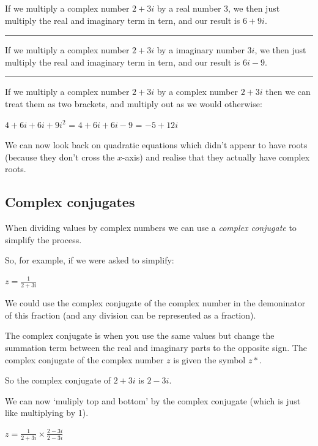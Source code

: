 \documentclass[
]{book}
\begin{document}
If we multiply a complex number \(2 + 3i\) by a real number \(3\), we then just multiply the real and imaginary term in tern, and our result is \(6+ 9i\).

\begin{center}\rule{0.5\linewidth}{0.5pt}\end{center}

If we multiply a complex number \(2 + 3i\) by a imaginary number \(3i\), we then just multiply the real and imaginary term in tern, and our result is \(6i-9\).

\begin{center}\rule{0.5\linewidth}{0.5pt}\end{center}

If we multiply a complex number \(2 + 3i\) by a complex number \(2+3i\) then we can treat them as two brackets, and multiply out as we would otherwise:

\(4 + 6 i + 6i + 9i^2\) = \(4 + 6 i + 6i - 9\) = \(-5+ 12i\)

We can now look back on quadratic equations which didn't appear to have roots (because they don't cross the \(x\)-axis) and realise that they actually have complex roots.

\hypertarget{complex-conjugates}{%
\subsection{Complex conjugates}\label{complex-conjugates}}

When dividing values by complex numbers we can use a \emph{complex conjugate} to simplify the process.

So, for example, if we were asked to simplify:

\(z = \frac{1}{2+3i}\)

We could use the complex conjugate of the complex number in the demoninator of this fraction (and any division can be represented as a fraction).

The complex conjugate is when you use the same values but change the summation term between the real and imaginary parts to the opposite sign. The complex conjugate of the complex number \(z\) is given the symbol \(z*\).

So the complex conjugate of \(2+3i\) is \(2-3i\).

We can now `muliply top and bottom' by the complex conjugate (which is just like multiplying by 1).

\(z = \frac{1}{2+3i}\times \frac{2-3i}{2-3i}\)
\end{document}

